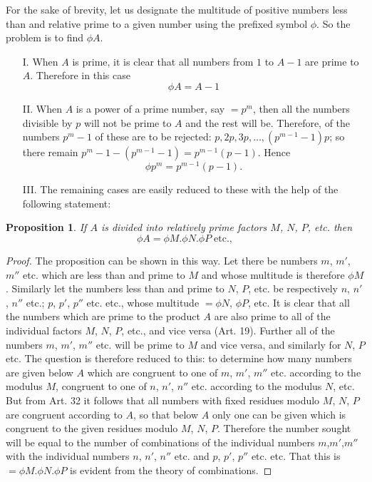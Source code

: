 \documentclass{book}
\theoremstyle{plain}
\newtheorem{proposition}{Proposition}
\theoremstyle{remark}
\begin{document}
For the sake of brevity, let us designate the multitude of positive numbers less than and relative prime to a given number using the prefixed symbol $\phi$.  So the problem is to find $\phi A$.
\begin{itemize}
\item[I.] When $A$ is prime, it is clear that all numbers from $1$ to $A-1$ are prime to $A$.  Therefore in this case 
\[ \phi A = A-1 \]
\item[II.] When $A$ is a power of a prime number, say $=p^m$, then all the numbers divisible by $p$ will not be prime to $A$ and the rest will be.  Therefore, of the numbers $p^m-1$ of these are to be rejected: $p, 2p, 3p, \dots, (p^{m-1}-1)p$; so there remain $p^m-1-(p^{m-1}-1) = p^{m-1}(p-1)$.   Hence
\[ \phi p^m = p^{m-1}(p-1). \]
\item[III.]  The remaining cases are easily reduced to these with the help of the following statement: 
\end{itemize}
\begin{proposition} If $A$ is divided into relatively prime factors $M$, $N$, $P$, etc. then
\[ \phi A = \phi M . \phi N . \phi P \; \textrm{etc.}, \]
\end{proposition}
\begin{proof} The proposition can be shown in this way.  Let there be numbers $m$, $m'$, $m''$ etc. which are less than and prime to $M$ and whose multitude is therefore $\phi M$.  Similarly let the numbers less than and prime to $N$, $P$, etc. be respectively $n$, $n'$, $n''$ etc.; $p$, $p'$, $p''$ etc. etc., whose multitude $=\phi N$, $\phi P$, etc.  It is clear that all the numbers which are prime to the product $A$ are also prime to all of the individual factors $M$, $N$, $P$, etc., and vice versa (Art. 19).    Further all of the numbers $m$, $m'$, $m''$ etc. will be prime to $M$ and vice versa, and similarly for $N$, $P$ etc.   The question is therefore reduced to this: to determine how many numbers are given below $A$ which are congruent to one of $m$, $m'$, $m''$ etc. according to the modulus $M$, congruent to one of $n$, $n'$, $n''$ etc. according to the modulus $N$, etc.   But from Art. 32 it follows that all numbers with fixed residues modulo $M$, $N$, $P$ are congruent according to $A$, so that below $A$ only one can be given which is congruent to the given residues modulo $M$, $N$, $P$.  Therefore the number sought will be equal to the number of combinations of the individual numbers $m$,$m'$,$m''$ with the individual numbers $n$, $n'$, $n''$ etc. and $p$, $p'$, $p''$ etc. etc.  That this is $=\phi M.\phi N.\phi P$ is evident from the theory of combinations. \end{proof}
\end{document}
